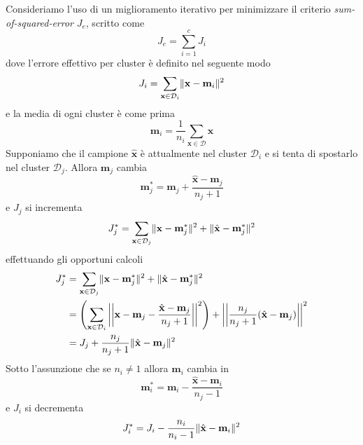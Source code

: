 \noindent Consideriamo l'uso di un miglioramento iterativo per minimizzare il criterio \emph{sum-of-squared-error} $J_e$, scritto come
\begin{equation}
J_e = \sum_{i=1}^c J_i
\end{equation}
dove l'errore effettivo per cluster è definito nel seguente modo
\begin{equation}
J_i = \sum_{\mathbf{x} \in \mathcal{D}_i} \lVert\mathbf{x}-\mathbf{m}_i\rVert^2
\end{equation}
e la media di ogni cluster è come prima
\begin{equation}
\mathbf{m}_i = \frac{1}{n_i} \sum_{\mathbf{x} \in \mathcal{D}} \mathbf{x}
\end{equation}
Supponiamo che il campione $\hat{\mathbf{x}}$ è attualmente nel cluster $\mathcal{D}_i$ e si tenta di spostarlo nel cluster $\mathcal{D}_j$. Allora $\mathbf{m}_j$ cambia
\begin{equation}
\mathbf{m}_j^* = \mathbf{m}_j + \frac{\hat{\mathbf{x}}-\mathbf{m}_j}{n_j+1}
\end{equation}
e $J_j$ si incrementa
\begin{equation}
J_j^* = \sum_{\mathbf{x} \in \mathcal{D}_j} \lVert\mathbf{x} - \mathbf{m}_j^*\rVert^2 + \lVert\hat{\mathbf{x}} - \mathbf{m}_j^*\rVert^2
\end{equation}
effettuando gli opportuni calcoli
\begin{equation}
\begin{split}
J_j^* &= \sum_{\mathbf{x} \in \mathcal{D}_j} \lVert\mathbf{x} - \mathbf{m}_j^*\rVert^2 + \lVert\hat{\mathbf{x}} - \mathbf{m}_j^*\rVert^2\\
&= \left(  \sum_{\mathbf{x} \in \mathcal{D}_i} \left|\left| \mathbf{x} - \mathbf{m}_j - \frac{\hat{\mathbf{x}}-\mathbf{m}_j}{n_j+1} \right| \right|^2   \right) + \left| \left|  \frac{n_j}{n_j +1} (\hat{\mathbf{x}} - \mathbf{m}_j)  \right| \right|^2 \\
&= J_j + \frac{n_j}{n_j+1}\lVert\hat{\mathbf{x}} - \mathbf{m}_j\rVert^2
\end{split}
\end{equation}
Sotto l'assunzione che se $n_i \neq 1$ allora $\mathbf{m}_i$ cambia in
\begin{equation}
\mathbf{m}_i^* = \mathbf{m}_i - \frac{\hat{\mathbf{x}} - \mathbf{m}_i }{n_j-1}
\end{equation}
e $J_i$ si decrementa 
\begin{equation}
J_i^* = J_i - \frac{n_i}{n_i-1} \lVert\hat{\mathbf{x}} - \mathbf{m}_i\rVert^2
\end{equation}
